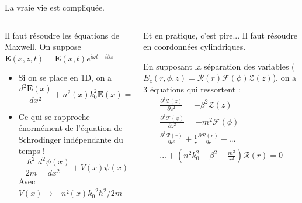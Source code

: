 \documentclass[aspectratio=149, 10pt, t]{beamer}
\begin{document}
\begin{frame}{La vraie vie est compliquée.}
    \begin{columns}
        \begin{column}{0.5\linewidth}
            Il faut résoudre les équations de Maxwell. On suppose $\boldsymbol{E}(x,z,t)=\boldsymbol{E}(x,t)e^{i\omega t - i\beta z}$
            \begin{itemize}
                \item Si on se place en 1D, on a
                \begin{equation}
\frac{d^{2} \boldsymbol{E}(x)}{d x^{2}}+n^{2}(x) k_{0}^{2} \boldsymbol{E}(x)=\beta^{2} \boldsymbol{E}(x)
\end{equation}
                \item Ce qui se rapproche énormément de l'équation de Schrodinger indépendante du temps !
                \begin{equation}
-\frac{\hbar^{2}}{2 m} \frac{d^{2} \psi(x)}{d x^{2}}+V(x) \psi(x)=E \psi(x)
\end{equation}
                Avec $V(x)\longrightarrow-n²(x){k_0}^2\hbar^2/2m$
            \end{itemize}
        \end{column}
        \begin{column}{0.5\linewidth}
            Et en pratique, c'est pire... Il faut résoudre en coordonnées cylindriques. 
            
            En supposant la séparation des variables ($E_z(r,\phi,z)=\mathcal{R}(r)\mathcal{F}(\phi)\mathcal{Z}(z)$), on a 3 équations qui ressortent :
            \begin{gather}
                \frac{\partial^{2} \mathcal{Z}(z)}{\partial z^{2}}=-\beta^{2} \mathcal{Z}(z)\\
                \frac{\partial^{2} \mathcal{F}(\phi)}{\partial z^{2}}=-m^{2} \mathcal{F}(\phi)\\
                \nonumber\frac{\partial^{2} \mathcal{R}(r)}{\partial r^{2}}+\frac{1}{r} \frac{\partial \mathcal{R}(r)}{\partial r}+...\\...+\left(n^{2} k_{0}^{2}-\beta^{2}-\frac{m^{2}}{r^{2}}\right) \mathcal{R}(r)=0
            \end{gather}
        \end{column}
    \end{columns}
\end{frame} 
\end{document}
